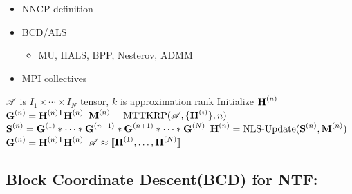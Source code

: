 \begin{itemize}
	\item NNCP definition
	\item BCD/ALS
	\begin{itemize}
		\item MU, HALS, BPP, Nesterov, ADMM
	\end{itemize}
	\item MPI collectives
\end{itemize}

\begin{algorithm}
\caption{$\CP = \text{NNCP}(\TA,k)$}
\label{alg:nncp}
\begin{algorithmic}[1]
\Require $\TA$ is $I_1\times \cdots \times I_N$ tensor, $k$ is approximation rank
\State {}
	\State Initialize $\Mn{H}{n}$ 
	\State $\Mn{G}{n} = \MnTra{H}{n}\Mn{H}{n}$
\EndFor
\State {}
	\State {}
	\State {}
	\State $\Mn{M}{n} = \text{MTTKRP}(\TA,\{\Mn{H}{i}\},n)$
	\State $\Mn{S}{n} = \Mn{G}{1} \Hada \cdots \Hada \Mn{G}{n-1} \Hada \Mn{G}{n+1} \Hada \cdots \Hada \Mn{G}{N}$
	\State $\Mn{H}{n} = \text{NLS-Update}(\Mn{S}{n},\Mn{M}{n})$
	\State $\Mn{G}{n} = \MnTra{H}{n}\Mn{H}{n}$
	\EndFor
\EndWhile
\Ensure $\TA \approx \CP$
\end{algorithmic}
\end{algorithm}

\subsection {Block Coordinate Descent(BCD) for NTF:}

